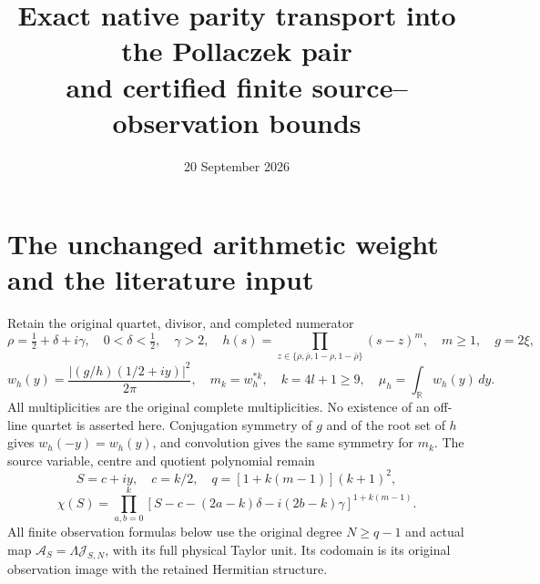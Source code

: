 \documentclass[11pt]{article}
\title{Exact native parity transport into the Pollaczek pair\\
and certified finite source--observation bounds}
\author{}
\date{20 September 2026}
\newcommand{\R}{\mathbb R}
\begin{document}
\maketitle

\section{The unchanged arithmetic weight and the literature input}

Retain the original quartet, divisor, and completed numerator
\[
 \rho=\tfrac12+\delta+i\gamma,\quad 0<\delta<\tfrac12,\quad\gamma>2,
 \quad h(s)=\prod_{z\in\{\rho,\bar\rho,1-\rho,1-\bar\rho\}}(s-z)^m,
 \quad m\geq1,\quad g=2\xi,
\]
\[
 w_h(y)=\frac{|(g/h)(1/2+iy)|^2}{2\pi},\quad
 m_k=w_h^{*k},\quad k=4l+1\geq9,\quad
 \mu_h=\int_\R w_h(y)\,dy.
\]
All multiplicities are the original complete multiplicities. No
existence of an off-line quartet is asserted here. Conjugation
symmetry of $g$ and of the root set of $h$ gives $w_h(-y)=w_h(y)$,
and convolution gives the same symmetry for $m_k$.
The source variable, centre and quotient polynomial remain
\[
 S=c+iy,\quad c=k/2,\quad q=[1+k(m-1)](k+1)^2,
\]
\[
 \chi(S)=\prod_{a,b=0}^k
 [S-c-(2a-k)\delta-i(2b-k)\gamma]^{1+k(m-1)}.
\]
All finite observation formulas below use the original degree
$N\geq q-1$ and actual map $\mathcal A_S=\Lambda\mathcal J_{S,N}$,
with its full physical Taylor unit. Its codomain is its original
observation image with the retained Hermitian structure.
\end{document}
